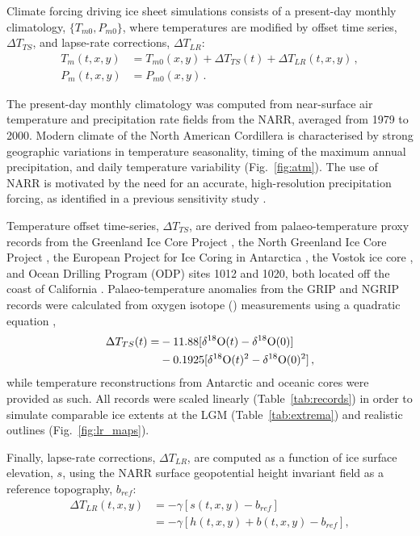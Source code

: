 \documentclass[tc, manuscript]{copernicus}
\begin{document}
Climate forcing driving ice sheet simulations consists of a present-day monthly
climatology,
$\{T_{m0}, P_{m0}\}$, where temperatures are modified by offset time series,
${\Delta}T_{TS}$, and lapse-rate corrections, ${\Delta}T_{LR}$:
\begin{align}
    T_m(t, x, y) &= T_{m0}(x, y) + {\Delta}T_{TS}(t)
                    + {\Delta}T_{LR}(t, x, y) \,, \\
    P_m(t, x, y) &= P_{m0}(x, y) \,.
\end{align}

The present-day monthly climatology was computed from
near-surface air temperature and precipitation rate fields from the NARR,
averaged from 1979 to 2000. Modern climate of the
North American Cordillera is characterised by strong geographic variations in
temperature seasonality, timing of the maximum annual precipitation, and
daily temperature variability (Fig.~\ref{fig:atm}).
The use of NARR is motivated by the need for an accurate,
high-resolution precipitation forcing, as identified in a previous sensitivity
study \citep{Seguinot.etal.2014}.

Temperature offset time-series, ${\Delta}T_{TS}$, are derived from
palaeo-temperature proxy records from
the Greenland Ice Core Project \citep[GRIP,][]{Dansgaard.etal.1993}, the
North Greenland Ice Core Project \citep[NGRIP,][]{Andersen.etal.2004},
the European Project for Ice Coring in Antarctica \citep[EPICA,][]
{Jouzel.etal.2007}, the Vostok ice core \citep{Petit.etal.1999}, and Ocean
Drilling Program (ODP) sites 1012 and 1020, both located off the coast of
California \citep{Herbert.etal.2001}. Palaeo-temperature anomalies from the
GRIP and NGRIP
records were calculated from oxygen isotope () measurements
using a quadratic equation \citep{Johnsen.etal.1995},
\begin{align}
    {\Delta}T_{TS}(t) = &-11.88 [\mathrm{\delta^{18}O}(t)
                                -\mathrm{\delta^{18}O}(0)] \nonumber \\
                        &-0.1925[\mathrm{\delta^{18}O}(t)^2
                                 -\mathrm{\delta^{18}O}(0)^2] \,,
\end{align}
while temperature reconstructions from Antarctic and oceanic cores were
provided as such. All records were scaled linearly (Table~\ref{tab:records}) in
order to simulate comparable ice extents at the LGM  (Table~\ref{tab:extrema})
and realistic outlines (Fig.~\ref{fig:lr_maps}).

Finally, lapse-rate corrections, ${\Delta}T_{LR}$, are computed as a function
of ice surface elevation, $s$, using the NARR surface geopotential height
invariant field as a reference topography, $b_{ref}$:
\begin{align}
    {\Delta}T_{LR}(t, x, y) &= -\gamma [s(t, x, y)-b_{ref}] \\
                            &= -\gamma [h(t, x, y)+b(t, x, y)-b_{ref}],
\end{align}
\end{document}
